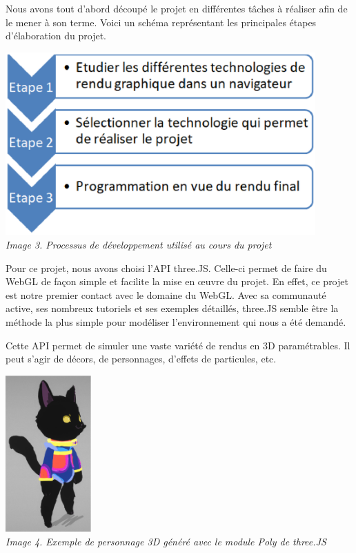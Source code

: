﻿Nous avons tout d'abord découpé le projet en différentes tâches à réaliser afin de le mener à son terme. Voici un schéma représentant les principales étapes d'élaboration du projet.

\begin{center}
	\includegraphics[height=7cm]{images/Processus-DEV.eps}\\
	\textit{Image 3. Processus de développement utilisé au cours du projet}\\
\end{center}

\newpage
Pour ce projet, nous avons choisi l'API three.JS. Celle-ci permet de faire du WebGL de façon simple et facilite la mise en œuvre du projet. En effet, ce projet est notre premier contact avec le domaine du WebGL. Avec sa communauté active, ses nombreux tutoriels et ses exemples détaillés, three.JS semble être la méthode la plus simple pour modéliser l'environnement qui nous a été demandé.

Cette API permet de simuler une vaste variété de rendus en 3D paramétrables. Il peut s'agir de décors, de personnages, d'effets de particules, etc.

\begin{center}
	\includegraphics[height=6cm]{images/threeJS-poly-cat.eps}\\
	\textit{Image 4. Exemple de personnage 3D généré avec le module Poly de three.JS}
\end{center}


